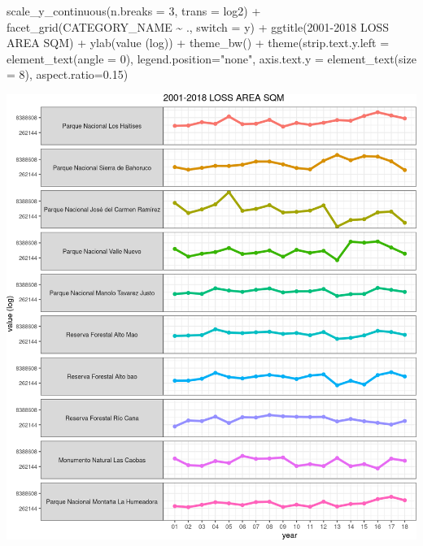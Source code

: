 \documentclass[10pt,landscape,a3paper]{article}
\newenvironment{Shaded}{\begin{snugshade}}{\end{snugshade}}
\newcommand{\AttributeTok}[1]{\textcolor[rgb]{0.77,0.63,0.00}{#1}}
\newcommand{\DecValTok}[1]{\textcolor[rgb]{0.00,0.00,0.81}{#1}}
\newcommand{\FloatTok}[1]{\textcolor[rgb]{0.00,0.00,0.81}{#1}}
\newcommand{\FunctionTok}[1]{\textcolor[rgb]{0.00,0.00,0.00}{#1}}
\newcommand{\NormalTok}[1]{#1}
\newcommand{\SpecialCharTok}[1]{\textcolor[rgb]{0.00,0.00,0.00}{#1}}
\newcommand{\StringTok}[1]{\textcolor[rgb]{0.31,0.60,0.02}{#1}}
\begin{document}
\begin{Shaded}
\begin{Highlighting}[]
  \FunctionTok{scale\_y\_continuous}\NormalTok{(}\AttributeTok{n.breaks =} \DecValTok{3}\NormalTok{, }\AttributeTok{trans =} \StringTok{\textquotesingle{}log2\textquotesingle{}}\NormalTok{) }\SpecialCharTok{+}
  \FunctionTok{facet\_grid}\NormalTok{(CATEGORY\_NAME }\SpecialCharTok{\textasciitilde{}}\NormalTok{ ., }\AttributeTok{switch =} \StringTok{\textquotesingle{}y\textquotesingle{}}\NormalTok{) }\SpecialCharTok{+}
  \FunctionTok{ggtitle}\NormalTok{(}\StringTok{\textquotesingle{}2001{-}2018 LOSS AREA SQM\textquotesingle{}}\NormalTok{) }\SpecialCharTok{+}
  \FunctionTok{ylab}\NormalTok{(}\StringTok{\textquotesingle{}value (log)\textquotesingle{}}\NormalTok{) }\SpecialCharTok{+}
  \FunctionTok{theme\_bw}\NormalTok{() }\SpecialCharTok{+}
  \FunctionTok{theme}\NormalTok{(}\AttributeTok{strip.text.y.left =} \FunctionTok{element\_text}\NormalTok{(}\AttributeTok{angle =} \DecValTok{0}\NormalTok{), }\AttributeTok{legend.position=}\StringTok{"none"}\NormalTok{,}
        \AttributeTok{axis.text.y =} \FunctionTok{element\_text}\NormalTok{(}\AttributeTok{size =} \DecValTok{8}\NormalTok{), }\AttributeTok{aspect.ratio=}\FloatTok{0.15}\NormalTok{)}
\end{Highlighting}
\end{Shaded}

\begin{center}\includegraphics{img/zonal-pa-5} \end{center}
\end{document}
